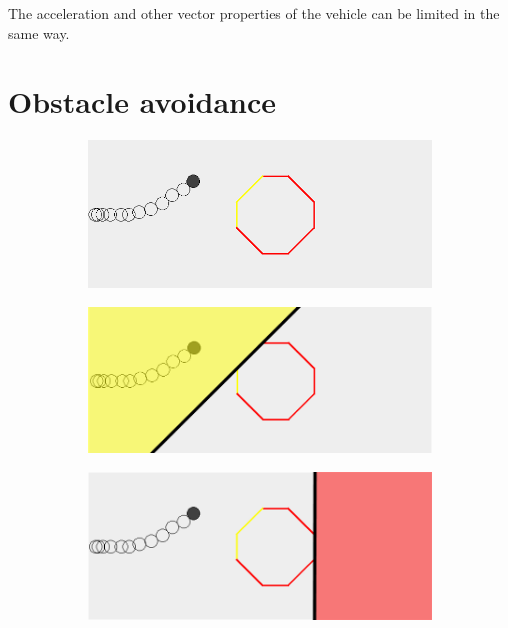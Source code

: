 The acceleration and other vector properties of the vehicle can be limited in the same way. 
\section{Obstacle avoidance}
\label{subsec:obs-avoid}
\begin{figure}[!t]
    \centering
    
    \begin{subfigure}[t]{0.47\textwidth}
        \includegraphics[width=\textwidth]{img/obs1}
        \caption{}
    \end{subfigure}
    \hfil
    \begin{subfigure}[t]{0.47\textwidth}
        \includegraphics[width=\textwidth]{img/obs2}
        \caption{}
    \end{subfigure}
    \par\bigskip
    \begin{subfigure}[t]{0.47\textwidth}
        \includegraphics[width=\textwidth]{img/obs3}

\end{subfigure}
\end{figure}
